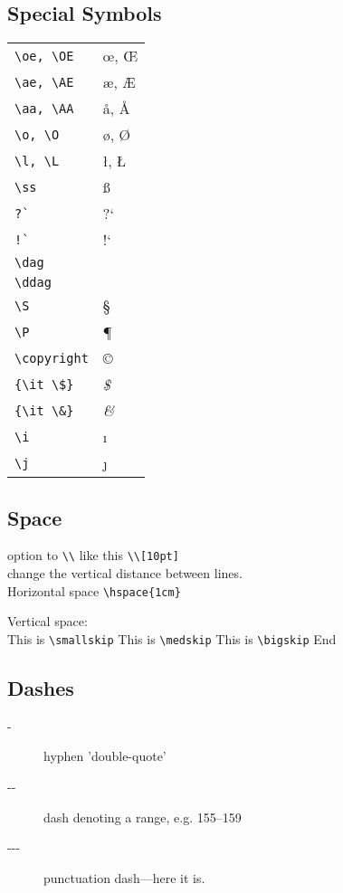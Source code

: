 \subsection{Special Symbols}
\begin{table}
    \centering
    \begin{tabular}{ll}
	\verb|\oe, \OE|	&   \oe, \OE	\\
	\verb|\ae, \AE|	&   \ae, \AE	\\
	\verb|\aa, \AA|	&   \aa, \AA	\\
	\verb|\o, \O|	&   \o, \O	\\
	\verb|\l, \L|	&   \l, \L	\\
	\verb|\ss|	&   \ss	\\
	\verb|?`|	&   ?`	\\
	\verb|!`|	&   !`	\\
	\verb|\dag|	&   \dag	\\
	\verb|\ddag|	&   \ddag	\\
	\verb|\S|	&   \S	\\
	\verb|\P|	&   \P	\\
	\verb|\copyright|   &   \copyright	\\
	\verb|{\it \$}|	&   {\it \$}	\\
	\verb|{\it \&}|	&   {\it \&}	\\
	\verb|\i|	&   \i	\\
	\verb|\j|	&   \j	\\
    \end{tabular}
\end{table}

\subsection{Space}
option to \verb|\\| like this \verb|\\[10pt]|	\\[10pt]
change the vertical distance between lines. \\
Horizontal space \verb|\hspace{1cm}|


Vertical space:	\\
This is \verb|\smallskip| 
\smallskip 
This is \verb|\medskip| 
\medskip
This is \verb|\bigskip|
\bigskip
End

\subsection{Dashes}
\begin{description}
    \item[-]	hyphen 'double-quote'
    \item[-{}-]	dash denoting a range, e.g. 155--159
    \item[-{}-{}-]	punctuation dash---here it is.
\end{description}

